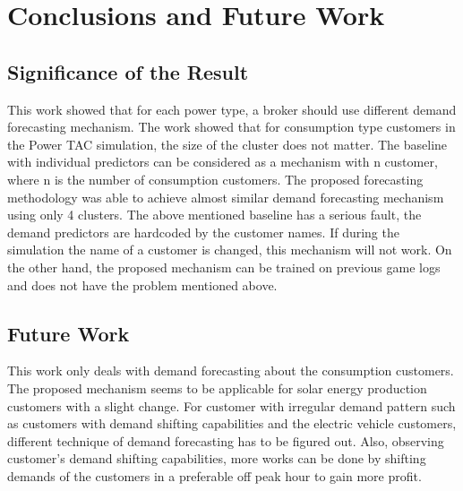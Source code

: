 
\chapter{Conclusions and Future Work}

\section{Significance of the Result}
This work showed that for each power type, a broker should use different demand forecasting mechanism. The work showed that for consumption type customers in the Power TAC simulation, the size of the cluster does not matter. The baseline with individual predictors can be considered as a mechanism with n customer, where n is the number of consumption customers. The proposed forecasting methodology was able to achieve almost similar demand forecasting mechanism using only 4 clusters. The above mentioned baseline has a serious fault, the demand predictors are hardcoded by the customer names. If during the simulation the name of a customer is changed, this mechanism will not work. On the other hand, the proposed mechanism can be trained on previous game logs and does not have the problem mentioned above.

\section{Future Work}

This work only deals with demand forecasting about the consumption customers. The proposed mechanism seems to be applicable for solar energy production customers with a slight change. For customer with irregular demand pattern such as customers with demand shifting capabilities and the electric vehicle customers, different technique of demand forecasting has to be figured out. Also, observing customer's demand shifting capabilities, more works can be done by shifting demands of the customers in a preferable off peak hour to gain more profit.

